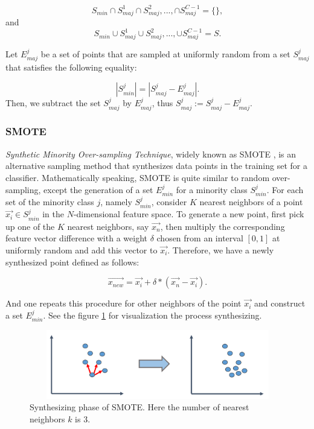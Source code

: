 \documentclass{article}
\begin{document}
	\begin{equation}
	S_{min} \cap S_{maj}^{1} \cap S_{maj}^{2},..., \cap S_{maj}^{C-1} = \{\},
	\end{equation}
	and
	\begin{equation}
	S_{min} \cup S_{maj}^{1} \cup S_{maj}^{2},..., \cup S_{maj}^{C-1} = S.
	\end{equation}
	
Let $E_{maj}^j$ be a set of points that are sampled at uniformly random from a set $S_{maj}^{j}$ that satisfies the following equality:

	\begin{equation}
	|S_{min}^{j}| = | S_{maj}^j -  E_{maj}^j |.
	\end{equation}
Then, we subtract the set $S_{maj}^j$ by $E_{maj}^j$, thus $S_{maj}^j := S_{maj}^j -  E_{maj}^j$.
		
		\subsubsection{SMOTE}
		\textit{Synthetic Minority Over-sampling Technique}, widely known as SMOTE \cite{SMOTE}, is an alternative sampling method that synthesizes data points in the training set for a classifier. Mathematically speaking, SMOTE is quite similar to random over-sampling, except the generation of a set $E_{min}^j$ for a minority class $S_{min}^j$. For each set of the minority class $j$, namely $S_{min}^j$, consider $K$ nearest neighbors of a point $\vec{x_i} \in S_{min}^j$ in the $N$-dimensional feature space. To generate a new point, first pick up one of the $K$ nearest neighbors, say $\vec{x_{n}}$, then multiply the corresponding feature vector difference with a weight  $\delta$  chosen from an interval $ [0,1]$ at uniformly random and add this vector to $\vec{x_i}$. Therefore, we have a newly synthesized point defined as follows:
		
		\begin{equation}
		\vec{x_{new}} = \vec{x_{i}} + \delta*(\vec{x_{n}} - \vec{x_{i}}).
		\end{equation}

And one repeats this procedure for other neighbors of the point $\vec{x_i}$ and construct a set $E_{min}^j$. See the figure \ref{smote} for visualization the process synthesizing.	
		
		\begin{figure}[ht]
		\begin{center}
		\vspace{0.5cm}
		\includegraphics[clip,width=12cm,height = 3cm]{figs/SMOTE.png}
		\vspace{0.5cm}
		\caption{Synthesizing phase of SMOTE. Here the number of nearest neighbors $k$ is 3.}
		\label{smote}
		\end{center}
		\end{figure}
		
\end{document}
